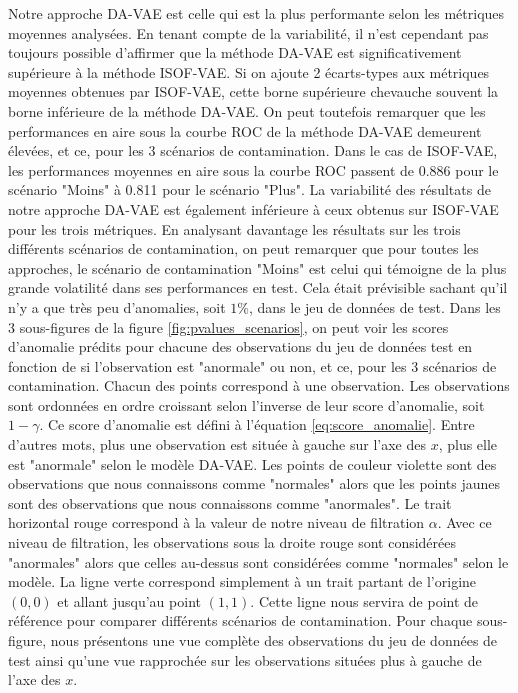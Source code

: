 Notre approche DA-VAE est celle qui est la plus performante selon les métriques moyennes analysées. En tenant compte de la variabilité, il n'est cependant pas toujours possible d'affirmer que la méthode DA-VAE est significativement supérieure à la méthode ISOF-VAE. Si on ajoute 2 écarts-types aux métriques moyennes obtenues par ISOF-VAE, cette borne supérieure chevauche souvent la borne inférieure de la méthode DA-VAE. On peut toutefois remarquer que les performances en aire sous la courbe ROC de la méthode DA-VAE demeurent élevées, et ce, pour les 3 scénarios de contamination. Dans le cas de ISOF-VAE, les performances moyennes en aire sous la courbe ROC passent de 0.886 pour le scénario "Moins" à 0.811 pour le scénario "Plus". La variabilité des résultats de notre approche DA-VAE est également inférieure à ceux obtenus sur ISOF-VAE pour les trois métriques. En analysant davantage les résultats sur les trois différents scénarios de contamination, on peut remarquer que pour toutes les approches, le scénario de contamination "Moins" est celui qui témoigne de la plus grande volatilité dans ses performances en test. Cela était prévisible sachant qu'il n'y a que très peu d'anomalies, soit $1\%$, dans le jeu de données de test. Dans les 3 sous-figures de la figure \ref{fig:pvalues_scenarios}, on peut voir les scores d'anomalie prédits pour chacune des observations du jeu de données test en fonction de si l'observation est "anormale" ou non, et ce, pour les 3 scénarios de contamination. Chacun des points correspond à une observation. Les observations sont ordonnées en ordre croissant selon l'inverse de leur score d'anomalie, soit $1-\gamma$. Ce score d'anomalie est défini à l'équation \ref{eq:score_anomalie}. Entre d'autres mots, plus une observation est située à gauche sur l'axe des $x$, plus elle est "anormale" selon le modèle DA-VAE. Les points de couleur violette sont des observations que nous connaissons comme "normales" alors que les points jaunes sont des observations que nous connaissons comme "anormales". Le trait horizontal rouge correspond à la valeur de notre niveau de filtration $\alpha$. Avec ce niveau de filtration, les observations sous la droite rouge sont considérées "anormales" alors que celles au-dessus sont considérées comme "normales" selon le modèle. La ligne verte correspond simplement à un trait partant de l'origine $(0,0)$ et allant jusqu'au point $(1,1)$. Cette ligne nous servira de point de référence pour comparer différents scénarios de contamination. Pour chaque sous-figure, nous présentons une vue complète des observations du jeu de données de test ainsi qu'une vue rapprochée sur les observations situées plus à gauche de l'axe des $x$.

